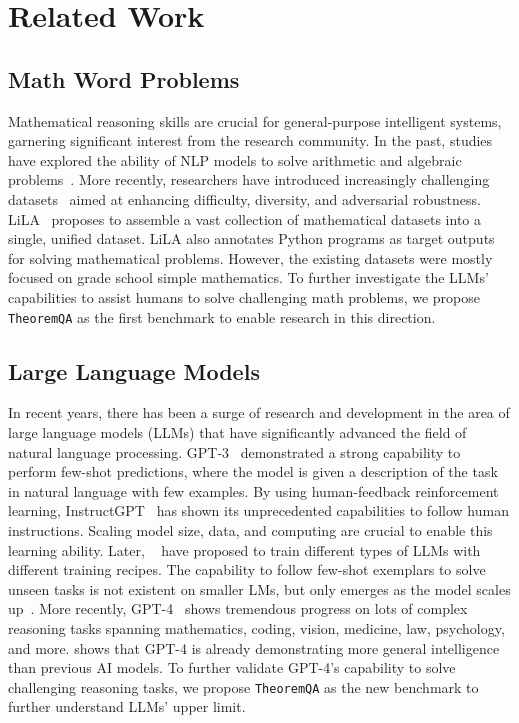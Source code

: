 \documentclass[11pt]{article}
\newcommand{\dataset}{\texttt{TheoremQA}\xspace}
\begin{document}
\section{Related Work}
\subsection{Math Word Problems} 
Mathematical reasoning skills are crucial for general-purpose intelligent systems, garnering significant interest from the research community. In the past, studies have explored the ability of NLP models to solve arithmetic and algebraic problems~\cite{hosseini2014learning,koncel2015parsing,roy2015solving,ling2017program}. More recently, researchers have introduced increasingly challenging datasets~\cite{saxton2019analysing,miao2020diverse,amini2019mathqa,hendrycks2measuring,lu2021iconqa,patel-etal-2021-nlp} aimed at enhancing difficulty, diversity, and adversarial robustness. LiLA~\cite{Mishra2022Lila} proposes to assemble a vast collection of mathematical datasets into a single, unified dataset. LiLA also annotates Python programs as target outputs for solving mathematical problems. However, the existing datasets were mostly focused on grade school simple mathematics. To further investigate the LLMs' capabilities to assist humans to solve challenging math problems, we propose \dataset as the first benchmark to enable research in this direction. 

\subsection{Large Language Models} 
In recent years, there has been a surge of research and development in the area of large language models (LLMs) that have significantly advanced the field of natural language processing. GPT-3~\cite{brown2020language} demonstrated a strong capability to perform few-shot predictions, where the model is given a description of the task in natural language with few examples. By using human-feedback reinforcement learning, InstructGPT~\cite{ouyang2022training} has shown its unprecedented capabilities to follow human instructions. Scaling model size, data, and computing are crucial to enable this learning ability. Later, ~\citet{rae2021scaling, chowdhery2022palm, zhang2022opt,touvron2023llama,chen2021evaluating} have proposed to train different types of LLMs with different training recipes. The capability to follow few-shot exemplars to solve unseen tasks is not existent on smaller LMs, but only emerges as the model scales up~\cite{weiemergent}. More recently, GPT-4~\cite{gpt4} shows tremendous progress on lots of complex reasoning tasks spanning mathematics, coding, vision, medicine, law, psychology, and more. \citet{bubeck2023sparks} shows that GPT-4 is already demonstrating more general intelligence than previous AI models. To further validate GPT-4's capability to solve challenging reasoning tasks, we propose \dataset as the new benchmark to further understand LLMs' upper limit.
\end{document}
